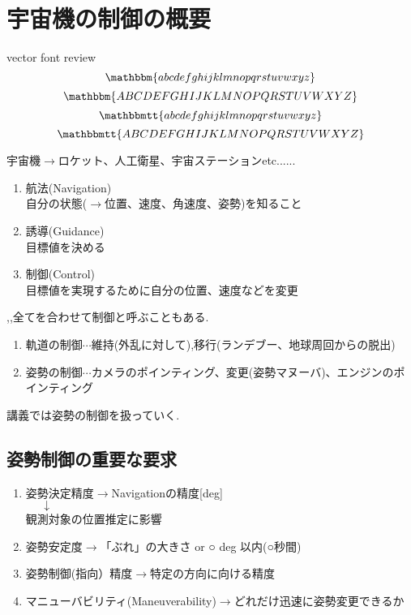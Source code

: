 \documentclass[class=article, crop=false, preview=false, dvipdfmx, a4paper]{standalone}
\begin{document}
\section{宇宙機の制御の概要}

{\Huge vector font review }
\[ \mathbbm{abcdefghijklmnopqrstuvwxyz} \]
\[ \mathbbm{ABCDEFGHIJKLMNOPQRSTUVWXYZ} \]
\[ \mathbbmtt{abcdefghijklmnopqrstuvwxyz} \]
\[ \mathbbmtt{ABCDEFGHIJKLMNOPQRSTUVWXYZ} \]


宇宙機$\rightarrow$ロケット、人工衛星、宇宙ステーションetc......
\begin{enumerate}[label = \maru{\theenumi}]
\item 航法(Navigation)\\
自分の状態($\rightarrow$位置、速度、角速度、姿勢)を知ること
\item 誘導(Guidance)\\
目標値を決める
\item 制御(Control)\\
目標値を実現するために自分の位置、速度などを変更
\end{enumerate}
,,全てを合わせて制御と呼ぶこともある.

\begin{enumerate}
      \renewcommand{\labelenumi}{\alph{enumi}).}
      \item 軌道の制御$\cdots$維持(外乱に対して),移行(ランデブー、地球周回からの脱出)
      \item 姿勢の制御$\cdots$カメラのポインティング、変更(姿勢マヌーバ)、エンジンのポインティング
\end{enumerate}
講義では姿勢の制御を扱っていく.


\subsection{姿勢制御の重要な要求}
\begin{enumerate}
\item 姿勢決定精度$\rightarrow$Navigationの精度[deg]\\
		$\mbox{    　}\downarrow$\\
 観測対象の位置推定に影響
\item 姿勢安定度$\rightarrow$「ぶれ」の大きさ  or ○ deg 以内(○秒間)
\item 姿勢制御(指向）精度$\rightarrow$特定の方向に向ける精度
\item マニューバビリティ(Maneuverability)$\rightarrow$どれだけ迅速に姿勢変更できるか
\end{enumerate}
\end{document}
